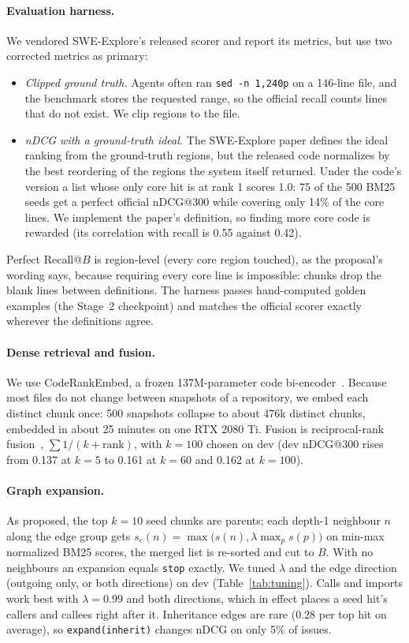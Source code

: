 \documentclass[11pt]{article}
\newcommand{\action}[1]{\texttt{#1}}
\begin{document}
\paragraph{Evaluation harness.} We vendored SWE-Explore's released scorer and
report its metrics, but use two corrected metrics as primary:
\begin{itemize}
  \item \emph{Clipped ground truth.} Agents often ran \texttt{sed -n 1,240p} on
  a 146-line file, and the benchmark stores the requested range, so the
  official recall counts lines that do not exist. We clip regions to the file.
  \item \emph{nDCG with a ground-truth ideal.} The SWE-Explore paper defines
  the ideal ranking from the ground-truth regions, but the released code
  normalizes by the best reordering of the regions the system itself returned.
  Under the code's version a list whose only core hit is at rank 1 scores 1.0:
  75 of the 500 BM25 seeds get a perfect official nDCG@300 while covering only
  14\% of the core lines. We implement the paper's definition, so finding more
  core code is rewarded (its correlation with recall is 0.55 against 0.42).
\end{itemize}
Perfect Recall@$B$ is region-level (every core region touched), as the
proposal's wording says, because requiring every core line is impossible:
chunks drop the blank lines between definitions. The harness passes
hand-computed golden examples (the Stage~2 checkpoint) and matches the
official scorer exactly wherever the definitions agree.

\paragraph{Dense retrieval and fusion.} We use CodeRankEmbed, a frozen
137M-parameter code bi-encoder~\citep{suresh2025cornstack}. Because most files
do not change between snapshots of a repository, we embed each distinct chunk
once: 500 snapshots collapse to about 476k distinct chunks, embedded in about
25 minutes on one RTX 2080 Ti. Fusion is reciprocal-rank
fusion~\citep{cormack2009rrf}, $\sum 1/(k + \mathrm{rank})$, with $k=100$
chosen on dev (dev nDCG@300 rises from 0.137 at $k=5$ to 0.161 at $k=60$ and
0.162 at $k=100$).

\paragraph{Graph expansion.} As proposed, the top $k=10$ seed chunks are
parents; each depth-1 neighbour $n$ along the edge group gets
$s_e(n) = \max\big(s(n), \lambda \max_{p} s(p)\big)$ on min-max normalized
BM25 scores, the merged list is re-sorted and cut to $B$. With no neighbours
an expansion equals \action{stop} exactly. We tuned $\lambda$ and the edge
direction (outgoing only, or both directions) on dev
(Table~\ref{tab:tuning}). Calls and imports work best with
$\lambda = 0.99$ and both directions, which in effect places a seed hit's
callers and callees right after it. Inheritance edges are rare (0.28 per top
hit on average), so \action{expand(inherit)} changes nDCG on only 5\% of
issues.
\end{document}
